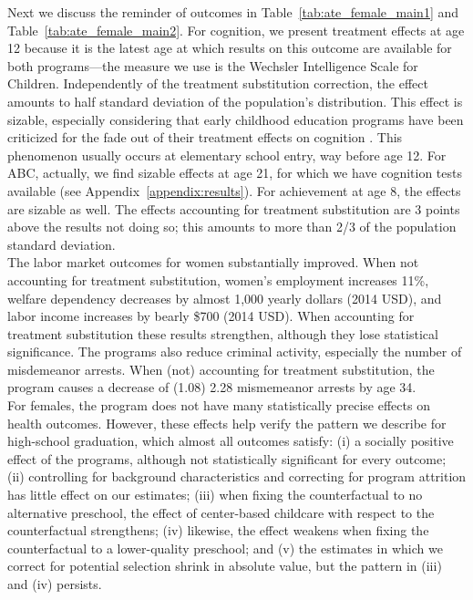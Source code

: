 \noindent Next we discuss the reminder of outcomes in Table~\ref{tab:ate_female_main1} and Table~\ref{tab:ate_female_main2}. For cognition, we present treatment effects at age 12 because it is the latest age at which results on this outcome are available for both programs---the measure we use is the Wechsler Intelligence Scale for Children. Independently of the treatment substitution correction, the effect amounts to half standard deviation of the population's distribution. This effect is sizable, especially considering that early childhood education programs have been criticized for the fade out of their treatment effects on cognition \citep{Elango_Hojman_etal_2016_Early-Edu}. This phenomenon usually occurs at elementary school entry, way before age 12. For ABC, actually, we find sizable effects at age 21, for which we have cognition tests available (see Appendix~\ref{appendix:results}). For achievement at age 8, the effects are sizable as well. The effects accounting for treatment substitution are 3 points above the results not doing so; this amounts to more than 2/3 of the population standard deviation.\\

\noindent The labor market outcomes for women substantially improved. When not accounting for treatment substitution, women's employment increases 11\%, welfare dependency decreases by almost 1,000 yearly dollars (2014 USD), and labor income increases by bearly \$700 (2014 USD). When accounting for treatment substitution these results strengthen, although they lose statistical significance. The programs also reduce criminal activity, especially the number of misdemeanor arrests. When (not) accounting for treatment substitution, the program causes a decrease of (1.08) 2.28 mismemeanor arrests by age 34.\\

\noindent For females, the program does not have many statistically precise effects on health outcomes. However, these effects help verify the pattern we describe for high-school graduation, which almost all outcomes satisfy: (i) a socially positive effect of the programs, although not statistically significant for every outcome; (ii) controlling for background characteristics and correcting for program attrition has little effect on our estimates; (iii) when fixing the counterfactual to no alternative preschool, the effect of center-based childcare with respect to the counterfactual strengthens; (iv) likewise, the effect weakens when fixing the counterfactual to a lower-quality preschool; and (v) the estimates in which we correct for potential selection shrink in absolute value, but the pattern in (iii) and (iv) persists.\\

